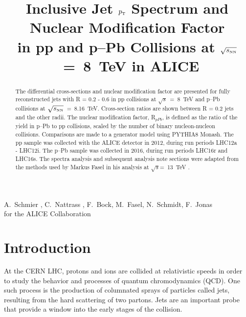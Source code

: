 \documentclass[ALICE]{ALICE_analysis_notes}
\newcommand{\pT}{$p_{\mbox{\tiny T}}$\xspace}
\newcommand{\sNN}{$\sqrt{s_{\mbox{\tiny NN}}}$\xspace}
\newcommand{\s}{$\sqrt{s}$\xspace}
\newcommand{\pPb}{{\mbox{p--Pb}}\xspace}
\newcommand{\pp}{pp\xspace}
\begin{document}
\title{Inclusive Jet \pT Spectrum and Nuclear Modification Factor\\ in pp and p--Pb Collisions at \sNN~=~8~TeV in ALICE}


\begin{Authlist}
A.~Schmier ,
C.~Nattrass ,
F.~Bock, 
M.~Fasel,
N.~Schmidt,
F.~Jonas\\
for the ALICE Collaboration
\end{Authlist}



\vspace{4cm}
\begin{abstract}
The differential cross-sections and nuclear modification factor are presented for fully reconstructed jets with R = 0.2 - 0.6 in \pp collisions at \s~=~8~TeV and \pPb collisions at \sNN~=~8.16~TeV. Cross-section ratios are shown between R = 0.2 jets and the other radii. The nuclear modification factor, R$_{pPb}$, is defined as the ratio of the yield in \pPb to \pp collisions, scaled by the number of binary nucleon-nucleon collisions. Comparisons are made to a generator model using PYTHIA8 Monash. The \pp sample was collected with the ALICE detector in 2012, during run periods LHC12a - LHC12i. The \pPb sample was collected in 2016, during run periods LHC16r and LHC16s. The spectra analysis and subsequent analysis note sections were adapted from the methods used by Markus Fasel in his analysis at \s =~13~TeV \cite{anaNoteMFasel}.
\end{abstract}

\newpage

\tableofcontents

\clearpage{}\section{Introduction}
\label{chap:Introduction}

At the CERN LHC, protons and ions are collided at relativistic speeds in order to study the behavior and processes of quantum chromodynamics (QCD). One such process is the production of columnated sprays of particles called jets, resulting from the hard scattering of two partons. Jets are an important probe that provide a window into the early stages of the collision.
\end{document}
